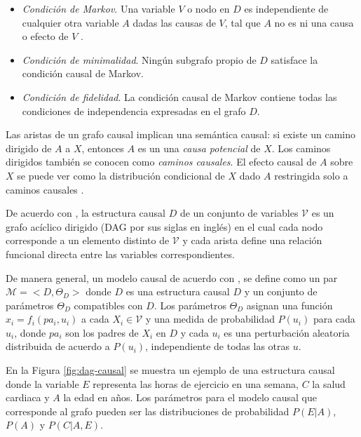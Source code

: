 \begin{itemize}
    \item \textit{Condición de Markov}. Una variable $V$ o nodo
    en $D$ es independiente de cualquier otra variable $A$ dadas las causas de $V$, tal que $A$ no es ni una causa o efecto de $V$ .
    \item \textit{Condición de minimalidad}. Ningún subgrafo propio de $D$ satisface la condición causal de Markov.
    \item \textit{Condición de fidelidad}. La condición causal de Markov contiene todas las condiciones de independencia expresadas en el grafo $D$.
\end{itemize}


Las aristas de un grafo causal implican una semántica causal: si existe un camino dirigido de $A$ a $X$, entonces $A$ es un una \textit{causa potencial} de $X$. Los caminos dirigidos también se conocen como \textit{caminos causales}. El efecto causal de $A$ sobre $X$ se puede ver como la distribución condicional de $X$ dado $A$ restringida solo a caminos causales \cite{dasgupta2019causal}.

De acuerdo con \cite{pearl_2009}, la estructura causal $D$ de un conjunto de variables $\mathcal{V}$ es un grafo acíclico dirigido (DAG por sus siglas en inglés) en el cual cada nodo corresponde a un elemento distinto de $\mathcal{V}$ y cada arista define una relación funcional directa entre las
variables correspondientes. 



De manera general, un modelo causal de acuerdo con \cite{pearl_2009}, se define como un par $\mathcal{M} = <D, \Theta_D>$ donde $D$
es una estructura causal 
$D$ y un conjunto de 
parámetros $\Theta_D$ compatibles con $D$. Los 
parámetros $\Theta_D$ asignan una función $x_i = f_i (pa_i, u_i)$ a cada $X_i \in\mathcal{V}$
y una medida de  probabilidad  $P(u_i)$ para cada $u_i$, donde $pa_i$ son 
los padres de $X_i$ en $D$ y cada $u_i$ es una perturbación aleatoria distribuida
de acuerdo a $P(u_i)$, independiente de todas las otras $u$.


En la Figura \ref{fig:dag-causal} se muestra un ejemplo de una
estructura causal donde la variable $E$ representa las horas de
ejercicio en una semana, $C$ la salud cardiaca y $A$ la edad en
años. Los parámetros para el modelo causal que corresponde al 
grafo pueden ser las distribuciones de probabilidad $P(E|A)$,
$P(A)$ y $P(C|A, E)$.

